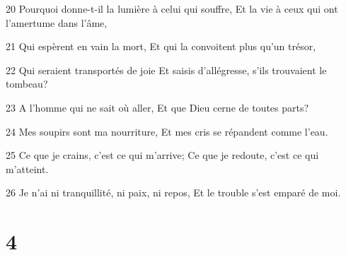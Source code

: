 \par 20 Pourquoi donne-t-il la lumière à celui qui souffre, Et la vie à ceux qui ont l'amertume dans l'âme,
\par 21 Qui espèrent en vain la mort, Et qui la convoitent plus qu'un trésor,
\par 22 Qui seraient transportés de joie Et saisis d'allégresse, s'ils trouvaient le tombeau?
\par 23 A l'homme qui ne sait où aller, Et que Dieu cerne de toutes parts?
\par 24 Mes soupirs sont ma nourriture, Et mes cris se répandent comme l'eau.
\par 25 Ce que je crains, c'est ce qui m'arrive; Ce que je redoute, c'est ce qui m'atteint.
\par 26 Je n'ai ni tranquillité, ni paix, ni repos, Et le trouble s'est emparé de moi.

\chapter{4}

